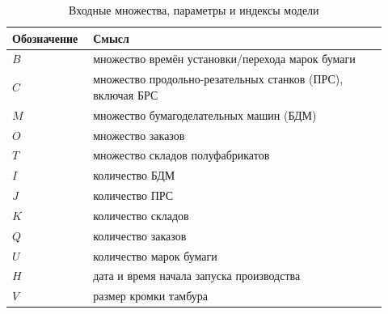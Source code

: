 \printnomenclature[3.5cm] %
\begin{table}[htbp]
\centering
\caption{Входные множества, параметры и индексы модели}%
\label{tab:theory_notation_input}%
\begin{tabular}{|p{0.18\linewidth}|p{0.74\linewidth}|}
\hline
\textbf{Обозначение} & \textbf{Смысл} \\
\hline
$B$ & множество времён установки/перехода марок бумаги \\
\hline
$C$ & множество продольно-резательных станков (ПРС), включая БРС \\
\hline
$M$ & множество бумагоделательных машин (БДМ) \\
\hline
$O$ & множество заказов \\ %
\hline
$T$ & множество складов полуфабрикатов \\
\hline
$I$ & количество БДМ \\
\hline
$J$ & количество ПРС \\
\hline
$K$ & количество складов \\
\hline
$Q$ & количество заказов \\
\hline
$U$ & количество марок бумаги \\
\hline
$H$ & дата и время начала запуска производства \\
\hline
$V$ & размер кромки тамбура \\
\hline
\end{tabular}
\end{table}

